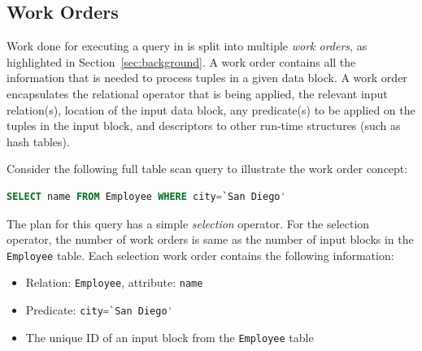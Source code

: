 \subsection{Work Orders}\label{ssec:workorders}
Work done for executing a query in \sys{} is split into multiple \textit{work 
orders}, as highlighted in Section~\ref{sec:background}. 
A work order contains all the information that is needed to process tuples in a given 
data block. 
A work order encapsulates the relational operator that is being applied, the relevant 
input relation(s), location of the input data block, any predicate(s) to be 
applied on the tuples in the input block, and descriptors to other run-time 
structures (such as hash tables).

Consider the following full table scan query to illustrate the work order concept:

\begin{lstlisting}[language=SQL, 
basicstyle=\ttfamily\small, 
showstringspaces=false,
keywordstyle=\color{cardinal}\bfseries, 
emph={San,Diego}, 
emphstyle=\color{bondiblue}\bfseries]
SELECT name FROM Employee WHERE city=`San Diego'
\end{lstlisting}	
\vspace{-0.4em}

The plan for this query has a simple \textit{selection} operator.  
For the selection operator, the number of work orders is same as the number of input blocks in the \verb+Employee+ table. 
Each selection work order contains the following information:
\begin{itemize}
\itemsep0.1em
\item {Relation: \verb+Employee+, attribute: \verb|name|}
\item {Predicate: \lstinline[language=SQL, 
                                   basicstyle=\ttfamily\small, 
                                   keywordstyle=\color{cardinal} \bfseries,
                                   emph={San,Diego}, 
                                   emphstyle=\color{bondiblue}\bfseries]|city=`San Diego'|}
\item {The unique ID of an input block from the \verb+Employee+ table}
\end{itemize}

